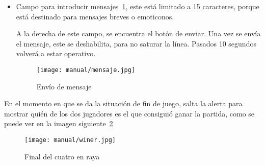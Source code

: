 \begin{itemize}
	\item Campo para introducir mensajes~\ref{fig:mensaje}, este está limitado a 15 caracteres, porque está destinado para mensajes breves o emoticonos.
	
	A la derecha de este campo, se encuentra el botón de enviar. Una vez se envía el mensaje, este se deshabilita, para no saturar la línea. Pasados 10 segundos volverá a estar operativo.
	
	\begin{figure}[H]
		\centering
		\texttt{[image: manual/mensaje.jpg]}
		\caption{Envío de mensaje}\label{fig:mensaje}
	\end{figure}
\end{itemize}

En el momento en que se da la situación de fin de juego, salta la alerta para mostrar quién de los dos jugadores es el que consiguió ganar la partida, como se puede ver en la imagen siguiente~\ref{fig:finalcuatro}

\begin{figure}[H]
	\centering
	\texttt{[image: manual/winer.jpg]}
	\caption{Final del cuatro en raya}\label{fig:finalcuatro}
\end{figure}